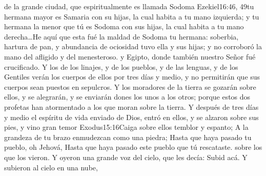  de la grande ciudad,%
 que espiritualmente es llamada Sodoma%
				   {Ezekiel}{16:46, 49}{tu hermana mayor es Samaria con su hijas, la cual habita a tu mano izquierda; y tu hermana la menor que tú es Sodoma con sus hijas, la cual habita a tu mano derecha\ldots He aquí que esta fué la maldad de Sodoma tu hermana: soberbia, hartura de pan, y abundancia de ociosidad tuvo ella y sus hijas; y no corroboró la mano del afligido y del menesteroso.}
 y Egipto,%
 donde también nuestro Señor fué crucificado.
Y los de los linajes, y de los pueblos, y de las lenguas, y de los Gentiles verán los cuerpos de ellos por tres días y medio, y no permitirán que sus cuerpos sean puestos en sepulcros. 
Y los moradores de la tierra se gozarán sobre ellos, y se alegrarán, y se enviarán dones los unos a los otros; porque estos dos profetas han atormentado a los que moran sobre la tierra.%
Y después de tres días y medio el espíritu de vida enviado de Dios, entró en ellos,%
 y se alzaron sobre sus pies,%
 y vino gran temor%
				  {Exodus}{15:16}{Caiga sobre ellos temblor y espanto; A la grandeza de tu brazo enmudezcan como una piedra; Hasta que haya pasado tu pueblo, oh Jehová, Hasta que haya pasado este pueblo que tú rescataste.} %
 sobre los que los vieron. 
Y oyeron una grande voz del cielo, que les decía: Subid acá. Y subieron al cielo en una nube,%
